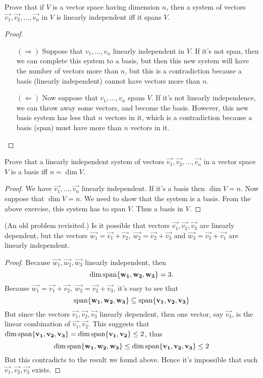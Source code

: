 \documentclass{article}
\begin{document}
\begin{exercise}
  Prove that if $V$ is a vector space having dimension $n$, then
  a system of vectors $\vec{v_1},\vec{v_2},\dots,\vec{v_n}$ in $V$
  is linearly independent iff it spans $V$.
\end{exercise}
\begin{proof}
  \text{}
  \begin{itemize}
    \item[$(\Longrightarrow)$] Suppose that $v_1,\dots,v_n$ linearly
      independent in $V$. If it's not span, then we can complete
      this system to a basis, but then this new system will have 
      the number of vectors more than $n$, but this is a contradiction
      because a basis (linearly independent) cannot have vectors more 
      than $n$.
    \item[$(\Longleftarrow)$] Now suppose that $v_1,\dots,v_n$ spans
      $V$. If it's not linearly independence, we can throw away some
      vectors, and become the basis. However, this new basis system
      has less that $n$ vectors in it, which is a contradiction because
      a basis (span) must have more than $n$ vectors in it.
  \end{itemize}
\end{proof}
\begin{exercise}
  Prove that a linearly independent system of vectors
  $\vec{v_1},\vec{v_2},\dots,\vec{v_n}$ in a vector
  space $V$ is a basis iff $n=\dim V$.
\end{exercise}
\begin{proof}
  We have $\vec{v_1},\dots,\vec{v_n}$ linearly independent.
  If it's a basis then $\dim V=n$. Now suppose that $\dim V=n$.
  We need to show that the system is a basis. From the above
  exercise, this system has to span $V$. Thus a basis in $V$.
\end{proof}
\begin{exercise}
  (An old problem revisited.) Is it possible that 
  vectors $\vec{v_1}, \vec{v_2}, \vec{v_3}$ are linearly
  dependent, but the vectors 
  $\vec{w_1}=\vec{v_1}+\vec{v_2},~\vec{w_2}=\vec{v_2}+\vec{v_3}$
  and $\vec{w_3}=\vec{v_3}+\vec{v_1}$ are linearly independent.
\end{exercise}
\begin{proof}
  Because $\vec{w_1},\vec{w_2},\vec{w_3}$ linearly independent, then
  \[\dim\operatorname{span}\{\mathbf{w_1},\mathbf{w_2},\mathbf{w_3}\}=3.\]
  Because $\vec{w_1}=\vec{v_1}+\vec{v_2},~\vec{w_2}=\vec{v_2}+\vec{v_3}$,
  it's easy to see that
  \[
    \operatorname{span}\{\mathbf{w_1},\mathbf{w_2},\mathbf{w_3}\}\subseteq
    \operatorname{span}\{\mathbf{v_1},\mathbf{v_2},\mathbf{v_3}\}
  \]
  But since the vectors $\vec{v_1},\vec{v_2},\vec{v_3}$ linearly dependent, 
  then one vector, say $\vec{v_3}$, is the linear combination of 
  $\vec{v_1},\vec{v_2}$. This suggests that 
  $\dim\operatorname{span}\{\mathbf{v_1},\mathbf{v_2},\mathbf{v_3}\}=
  \dim\operatorname{span}\{\mathbf{v_1},\mathbf{v_2}\}\leq 2$, 
  thus
  \[
    \dim\operatorname{span}\{\mathbf{w_1},\mathbf{w_2},\mathbf{w_3}\}\leq
    \dim\operatorname{span}\{\mathbf{v_1},\mathbf{v_2},\mathbf{v_3}\}
    \leq 2
  \]
  But this contradicts to the result we found above. Hence it's 
  impossible that such $\vec{v_1},\vec{v_2},\vec{v_3}$ exists.
\end{proof}
\end{document}

